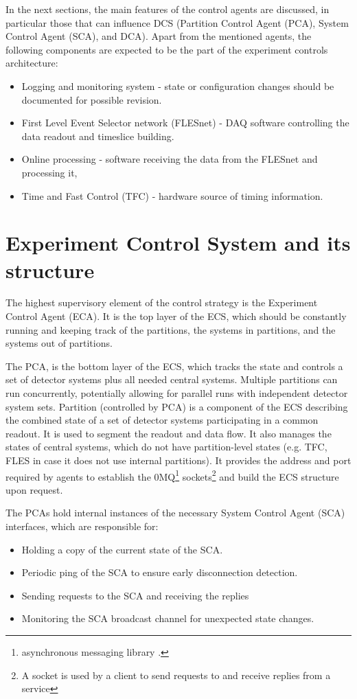  In the next sections, the main features of the control agents are discussed, in particular those that can influence \gls{DCS} (Partition Control Agent (\gls{PCA}), System Control Agent (\gls{SCA}), and \gls{DCA}). Apart from the mentioned agents, the following components are expected to be the part of the experiment controls architecture: 
 \begin{itemize}
     \item Logging and monitoring system - state or configuration changes should be documented for possible revision.
     \item First Level Event Selector network (FLESnet) - \gls{DAQ} software controlling the data readout and timeslice building.
     \item Online processing - software receiving the data from the FLESnet and processing it,
     \item Time and Fast Control (\gls{TFC}) - hardware source of timing information.
 \end{itemize}
\section{Experiment Control System and its structure}\label{sssAgents}

The highest supervisory element of the control strategy is the Experiment Control Agent (\gls{ECA}). It is the top layer of the \gls{ECS}, which should be constantly running and keeping track of the  partitions, the systems in partitions, and the systems out of partitions. 

The \gls{PCA}, is the bottom layer of the \gls{ECS}, which tracks the state and controls a set of detector systems plus all needed central systems. Multiple partitions can run concurrently, potentially allowing for parallel runs with independent detector system sets. Partition (controlled by \gls{PCA}) is a component of the \gls{ECS} describing the combined state of a set of detector systems participating in a common readout. It is used to segment the readout and data flow. It also manages the states of central systems, which do not have partition-level states (e.g. \gls{TFC}, \gls{FLES} in case it does not use internal partitions).  It provides the address and port required by agents to establish the 0MQ\footnote{asynchronous messaging library \cite{zeromq}.} sockets\footnote{A socket is used by a client to send requests to and receive replies from a service} and build the \gls{ECS} structure upon request.

The \glspl{PCA} hold internal instances of the necessary System Control Agent (\gls{SCA}) interfaces, which are responsible for:
\begin{itemize}
 \item Holding a copy of the current state of the \gls{SCA}.
 \item Periodic ping of the \gls{SCA} to ensure early disconnection detection.
 \item Sending requests to the \gls{SCA} and receiving the replies
 \item Monitoring the \gls{SCA} broadcast channel for unexpected state changes.
\end{itemize}

